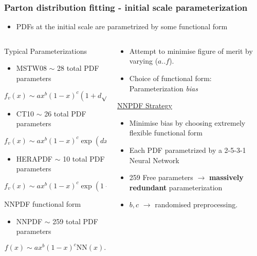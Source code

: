 \documentclass[10pt]{beamer}
\newcommand{\be}{\begin{equation*}}
\newcommand{\ee}{\end{equation*}}
\begin{document}
\begin{frame}
\frametitle{Parton distribution fitting - initial scale parameterization}
\begin{itemize}
\item PDFs at the initial scale are parametrized by some functional form
\end{itemize}

\begin{columns}
\begin{column}{0.5\textwidth}
\begin{block} {\centering \small Typical Parameterizations}
\begin{itemize}
\item<1-> \small MSTW08 $\sim$ 28 total PDF parameters 
\end{itemize}
    \be f_v(x) \sim ax^{b}(1-x)^{c}(1+d\sqrt{x}+e x),\ee   \begin{itemize}
\item<1-> \small CT10   $\sim$ 26 total PDF parameters 
	\end{itemize}
	\small \be f_v(x) \sim ax^b(1-x)^c \exp{(dx + ex^2 + f\sqrt{x})}.\ee \begin{itemize}
\item<1-> \small HERAPDF   $\sim$ 10 total PDF parameters 
	\end{itemize}
		\small \be f_v(x) \sim ax^b(1-x)^c \exp{(1+dx + ex^2)}.\ee

\end{block}

\begin{block}
{ \small \centering NNPDF functional form}
\begin{itemize}
\item<1-> \small NNPDF $\sim$ 259 total PDF parameters 
\end{itemize}
\be f(x) \sim ax^b(1-x)^{c} \mathrm{NN}(x). \ee
\end{block}
\end{column}
	\begin{column}{0.4\textwidth}
	\small 
	
\begin{itemize} \small
\item<1-> Attempt to minimise figure of merit by varying ($a$..$f$).
\item<1-> Choice of functional form: Parameterization \emph{bias}
\end{itemize}
\vskip10pt
\begin{center}
\underline{NNPDF Strategy}\end{center}
\vskip-10pt
\begin{itemize} \small
\item<1-> Minimise bias by choosing extremely flexible functional form
\item<1-> Each PDF parametrized by a 2-5-3-1 Neural Network
\item<1-> 259 Free parameters $\to$ \textbf{massively redundant} parameterization
\item<1-> $b,c$  $\to$ randomised preprocessing.


\end{itemize}
\end{column}
\end{columns}
\end{frame}
\end{document}
